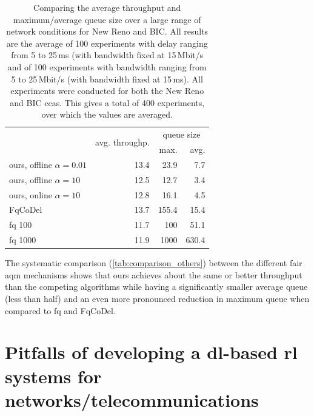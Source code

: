 \documentclass[conference]{IEEEtran}
\begin{document}
\begin{table}
\caption{Comparing the average throughput and maximum/average queue size over a large range of network conditions for New Reno and BIC. All results are the average of 100 experiments with delay ranging from 5 to 25\,ms (with bandwidth fixed at 15\,Mbit/s and of 100 experiments with bandwidth ranging from 5 to 25\,Mbit/s (with bandwidth fixed at 15\,ms). All experiments were conducted for both the New Reno and BIC \glspl{cca}. This gives a total of 400 experiments, over which the values are averaged.} \label{tab:comparison_others}
\centering
\begin{tabular}{l r r r} \toprule
& \multirow{2}{*}{avg. throughp.} & \multicolumn{2}{c}{queue size} \\
& & max. & avg. \\ \midrule
\gls{ours}, offline $\alpha=0.01$ & 13.4 & 23.9 & 7.7\\
\gls{ours}, offline $\alpha=10$ & 12.5 & 12.7 & 3.4\\
\gls{ours}, online $\alpha=10$ & 12.8 & 16.1 & 4.5\\
FqCoDel	& 13.7 & 155.4 & 15.4\\
fq 100	& 11.7 & 100 & 51.1\\
fq 1000	& 11.9 & 1000 & 630.4 \\
\bottomrule
\end{tabular}
\end{table}

The systematic comparison (\autoref{tab:comparison_others}) between the different fair \gls{aqm} mechanisms shows that \gls{ours} achieves about the same or better throughput than the competing algorithms while having a significantly smaller average queue (less than half) and an even more pronounced reduction in maximum queue when compared to fq and FqCoDel.  

\section{Pitfalls of developing a \gls{dl}-based \gls{rl} systems for networks/telecommunications}
\end{document}
